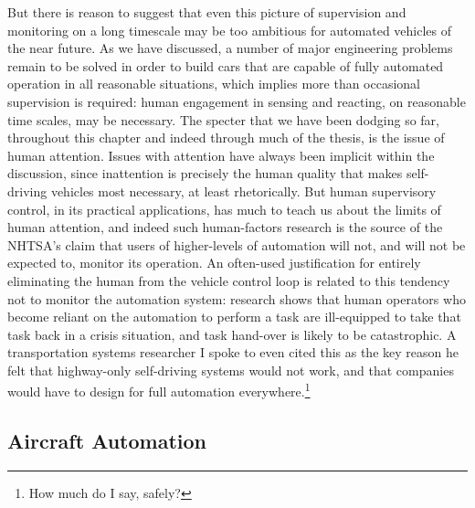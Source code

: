 But there is reason to suggest that even this picture of supervision
and monitoring on a long timescale may be too ambitious for automated
vehicles of the near future. As we have discussed, a number of major
engineering problems remain to be solved in order to build cars that
are capable of fully automated operation in all reasonable situations,
which implies more than occasional supervision is required: human engagement in
sensing and reacting, on reasonable time scales, may be necessary. The
specter that we have been dodging so far, throughout this chapter and
indeed through much of the thesis, is the issue of human attention.
Issues with attention have always been implicit within the discussion,
since inattention is precisely the human quality that makes
self-driving vehicles most necessary, at least rhetorically. But human
supervisory control, in its practical applications, has much to teach
us about the limits of human attention, and indeed such human-factors
research is the source of the NHTSA's claim that users of
higher-levels of automation will not, and will not be expected to,
monitor its operation. An often-used justification
for entirely eliminating the human from the vehicle control loop is
related to this tendency not to monitor the automation system:
research shows that human operators who become reliant on the
automation to perform a task are ill-equipped to take that task back
in a crisis situation, and task hand-over is likely to be
catastrophic.\cite{???} A transportation systems researcher I spoke to
even cited this as the key reason he felt that highway-only
self-driving systems would not work, and that companies would have to
design for full automation everywhere.\footnote{How much do I say,
  safely?} 

\subsection{Aircraft Automation}

